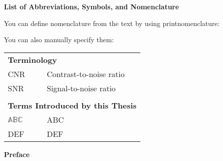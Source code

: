\begin{preliminary}
\tableofcontents\newpage
\newpage
{}
\listoffigures
\newpage
{}
\listofalgorithms
{}
\newpage
{}
\listoftables
\newpage
{}
\listofmyappendices\newpage

\Large \textbf{List of Abbreviations, Symbols, and Nomenclature} \normalsize

You can define nomenclature from the text by using printnomenclature:
\printnomenclature

You can also manually specify them:

\begin{tabular}{lcl}
\\
\multicolumn{3}{l}{\textbf{Terminology}}\\
CNR & & Contrast-to-noise ratio \\
SNR & \, & Signal-to-noise ratio \\
\\
\multicolumn{3}{l}{\textbf{Terms Introduced by this Thesis}}\\
$\mathbb{ABC}$ && ABC \\
DEF & \, & DEF \\
\end{tabular}

\newpage

\clearpage

\Large\begin{center}\textbf{Preface}\end{center}\normalsize
\onehalfspacing
%

\newpage

% 
% 
% 
% 
% 

\end{preliminary}








